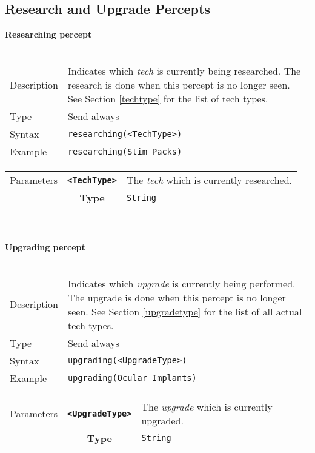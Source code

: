 \subsection{Research and Upgrade Percepts}
\textbf{Researching percept}\\
\\
\begin{tabularx}{\textwidth}{lX}
 Description & Indicates which \textit{tech} is currently being researched. The research is done when this percept is no longer seen. See Section \ref{techtype} for the list of tech types. \\
 Type & Send always \\
 Syntax & \verb|researching(<TechType>)| \\
 Example & \verb|researching(Stim Packs)| \\
 \end{tabularx}
 \begin{tabularx}{\textwidth}{l | c | p{8cm}|}
 \cline{2-3}
 Parameters & \textbf{\verb|<TechType>|} & The \textit{tech} which is currently researched. \\
            & \textbf{Type} & \verb|String| \\
            \cline{2-3}
\end{tabularx}\\
\\
\textbf{Upgrading percept}\\
\\
\begin{tabularx}{\textwidth}{lX}
 Description & Indicates which \textit{upgrade} is currently being performed. The upgrade is done when this percept is no longer seen. See Section \ref{upgradetype} for the list of all actual tech types. \\
 Type & Send always \\
 Syntax & \verb|upgrading(<UpgradeType>)| \\
 Example & \verb|upgrading(Ocular Implants)| \\
 \end{tabularx}
 \begin{tabularx}{\textwidth}{l | c | p{8cm}|}
 \cline{2-3}
 Parameters & \textbf{\verb|<UpgradeType>|} & The \textit{upgrade} which is currently upgraded. \\
            & \textbf{Type} & \verb|String| \\
            \cline{2-3}
\end{tabularx}\\

